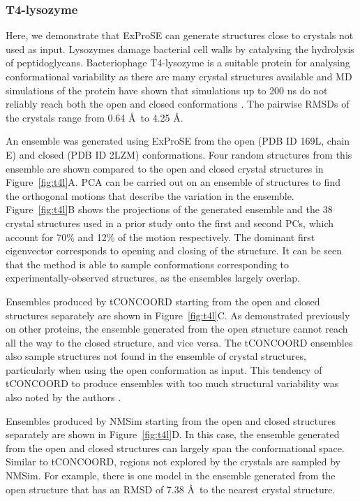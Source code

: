 \subsubsection{T4-lysozyme}

Here, we demonstrate that ExProSE can generate structures close to crystals not used as input.
Lysozymes damage bacterial cell walls by catalysing the hydrolysis of peptidoglycans.
Bacteriophage T4-lysozyme is a suitable protein for analysing conformational variability as there are many crystal structures available and MD simulations of the protein have shown that simulations up to 200 ns do not reliably reach both the open and closed conformations \cite{Seeliger2007}.
The pairwise RMSDs of the crystals range from 0.64 \AA\ to 4.25 \AA.

An ensemble was generated using ExProSE from the open (PDB ID 169L, chain E) and closed (PDB ID 2LZM) conformations.
Four random structures from this ensemble are shown compared to the open and closed crystal structures in Figure~\ref{fig:t4l}A.
PCA can be carried out on an ensemble of structures to find the orthogonal motions that describe the variation in the ensemble.
Figure~\ref{fig:t4l}B shows the projections of the generated ensemble and the 38 crystal structures used in a prior study \cite{DeGroot1998} onto the first and second PCs, which account for 70\% and 12\% of the motion respectively.
The dominant first eigenvector corresponds to opening and closing of the structure.
It can be seen that the method is able to sample conformations corresponding to experimentally-observed structures, as the ensembles largely overlap.

Ensembles produced by tCONCOORD starting from the open and closed structures separately are shown in Figure~\ref{fig:t4l}C.
As demonstrated previously on other proteins, the ensemble generated from the open structure cannot reach all the way to the closed structure, and vice versa.
The tCONCOORD ensembles also sample structures not found in the ensemble of crystal structures, particularly when using the open conformation as input.
This tendency of tCONCOORD to produce ensembles with too much structural variability was also noted by the authors \cite{Seeliger2009}.

Ensembles produced by NMSim starting from the open and closed structures separately are shown in Figure~\ref{fig:t4l}D.
In this case, the ensemble generated from the open and closed structures can largely span the conformational space.
Similar to tCONCOORD, regions not explored by the crystals are sampled by NMSim.
For example, there is one model in the ensemble generated from the open structure that has an RMSD of 7.38 \AA\ to the nearest crystal structure.

